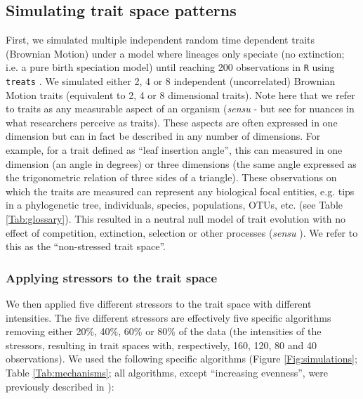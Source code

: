\documentclass[12pt,letterpaper]{article}
\begin{document}
\subsection{Simulating trait space patterns}

First, we simulated multiple independent random time dependent traits (Brownian Motion) under a model where lineages only speciate (no extinction; i.e. a pure birth speciation model) until reaching 200 observations in \texttt{R} \citep{rcore} using \texttt{treats} \citep{guillerme2024treats}.
We simulated either 2, 4 or 8 independent (uncorrelated) Brownian Motion traits (equivalent to 2, 4 or 8 dimensional traits).
Note here that we refer to traits as any measurable aspect of an organism (\textit{sensu} \cite{mcgill2006rebuilding} - but see \cite{dawson2021traits} for nuances in what researchers perceive as traits).
These aspects are often expressed in one dimension but can in fact be described in any number of dimensions.
For example, for a trait defined as ``leaf insertion angle'', this can measured in one dimension (an angle in degrees) or three dimensions (the same angle expressed as the trigonometric relation of three sides of a triangle).
These observations on which the traits are measured can represent any biological focal entities, e.g. tips in a phylogenetic tree, individuals, species, populations, OTUs, etc. (see Table \ref{Tab:glossary}).
This resulted in a neutral null model of trait evolution with no effect of competition, extinction, selection or other processes (\textit{sensu} \citealt{bausman2018modeling}).
We refer to this as the ``non-stressed trait space''.

\subsubsection{Applying stressors to the trait space}

We then applied five different stressors to the trait space with different intensities.
The five different stressors are effectively five specific algorithms removing either 20\%, 40\%, 60\% or 80\% of the data (the intensities of the stressors, resulting in trait spaces with, respectively, 160, 120, 80 and 40 observations).
We used the following specific algorithms (Figure \ref{Fig:simulations}; Table \ref{Tab:mechanisms}; all algorithms, except ``increasing evenness'', were previously described in \cite{guillerme2020shifting}):
\end{document}

